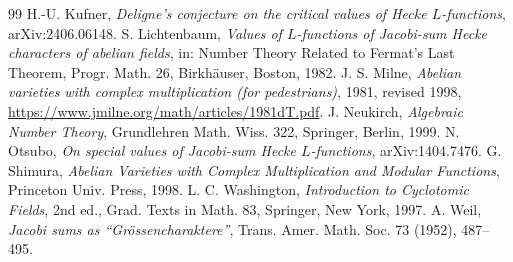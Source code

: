 \documentclass[11pt]{amsart}
\theoremstyle{remark}
\theoremstyle{definition}
\begin{document}
\begin{thebibliography}{99}
 H.-U. Kufner, \emph{Deligne's conjecture on the critical values of Hecke $L$-functions}, arXiv:2406.06148.
 S. Lichtenbaum, \emph{Values of $L$-functions of Jacobi-sum Hecke characters of abelian fields}, in: Number Theory Related to Fermat's Last Theorem, Progr. Math. 26, Birkh\"auser, Boston, 1982.
 J. S. Milne, \emph{Abelian varieties with complex multiplication (for pedestrians)}, 1981, revised 1998, \url{https://www.jmilne.org/math/articles/1981dT.pdf}.
 J. Neukirch, \emph{Algebraic Number Theory}, Grundlehren Math. Wiss. 322, Springer, Berlin, 1999.
 N. Otsubo, \emph{On special values of Jacobi-sum Hecke $L$-functions}, arXiv:1404.7476.
 G. Shimura, \emph{Abelian Varieties with Complex Multiplication and Modular Functions}, Princeton Univ. Press, 1998.
 L. C. Washington, \emph{Introduction to Cyclotomic Fields}, 2nd ed., Grad. Texts in Math. 83, Springer, New York, 1997.
 A. Weil, \emph{Jacobi sums as ``Gr\"ossencharaktere''}, Trans. Amer. Math. Soc. 73 (1952), 487--495.
\end{thebibliography}
\end{document}
